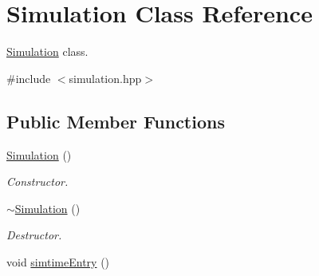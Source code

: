 \hypertarget{classSimulation}{\section{Simulation Class Reference}
\label{classSimulation}
}


\hyperlink{classSimulation}{Simulation} class.  




{\ttfamily \#include $<$simulation.\-hpp$>$}

\subsection*{Public Member Functions}
\begin{DoxyCompactItemize}
\item 
\hyperlink{classSimulation_a5b224cc5b36bcc8eb29689aff223de41}{Simulation} ()
\begin{DoxyCompactList}\small\item\em Constructor. \end{DoxyCompactList}\item 
\hypertarget{classSimulation_a80fad3f57dfaf195a36f7bc49bc88279}{\hyperlink{classSimulation_a80fad3f57dfaf195a36f7bc49bc88279}{$\sim$\-Simulation} ()}\label{classSimulation_a80fad3f57dfaf195a36f7bc49bc88279}

\begin{DoxyCompactList}\small\item\em Destructor. \end{DoxyCompactList}\item 
\hypertarget{classSimulation_a10db4c4b53c317b2213d47ddbb38a26c}{void \hyperlink{classSimulation_a10db4c4b53c317b2213d47ddbb38a26c}{simtime\-Entry} ()}\label{classSimulation_a10db4c4b53c317b2213d47ddbb38a26c}


\end{DoxyCompactItemize}
